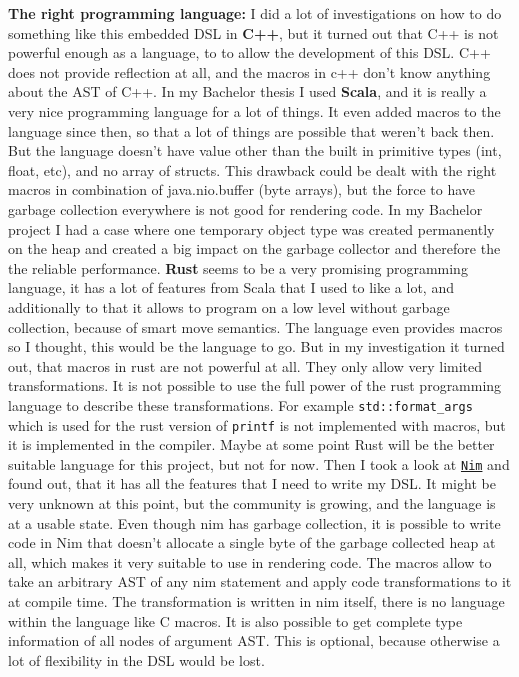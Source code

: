 \documentclass[10pt]{report}
\begin{document}
\textbf{The right programming language:} I did a lot of investigations on how to do something like this embedded DSL in \textbf{C++}, but it turned out that C++ is not powerful enough as a language, to to allow the development of this DSL. C++ does not provide reflection at all, and the macros in c++ don't know anything about the AST of C++. In my Bachelor thesis I used \textbf{Scala}, and it is really a very nice programming language for a lot of things. It even added macros to the language since then, so that a lot of things are possible that weren't back then. But the language doesn't have value other than the built in primitive types (int, float, etc), and no array of structs. This drawback could be dealt with the right macros in combination of java.nio.buffer (byte arrays), but the force to have garbage collection everywhere is not good for rendering code. In my Bachelor project I had a case where one temporary object type was created permanently on the heap and created a big impact on the garbage collector and therefore the the reliable performance. \textbf{Rust} seems to be a very promising programming language, it has a lot of features from Scala that I used to like a lot, and additionally to that it allows to program on a low level without garbage collection, because of smart move semantics. The language even provides macros so I thought, this would be the language to go. But in my investigation it turned out, that macros in rust are not powerful at all. They only allow very limited transformations. It is not possible to use the full power of the rust programming language to describe these transformations. 
For example \texttt{std::format\_{}args} which is used for the rust version of \texttt{printf} is not implemented with macros, but it is implemented in the compiler. 
Maybe at some point Rust will be the better suitable language for this project, but not for now. Then I took a look at \href{http://nim-lang.org/}{\texttt{Nim}} and found out, that it has all the features that I need to write my DSL. It might be very unknown at this point, but the community is growing, and the language is at a usable state. Even though nim has garbage collection, it is possible to write code in Nim that doesn't allocate a single byte of the garbage collected heap at all, which makes it very suitable to use in rendering code. The macros allow to take an arbitrary AST of any nim statement and apply code transformations to it at compile time. The transformation is written in nim itself, there is no language within the language like C macros. It is also possible to get complete type information of all nodes of argument AST. This is optional, because otherwise a lot of flexibility in the DSL would be lost.
\end{document}
